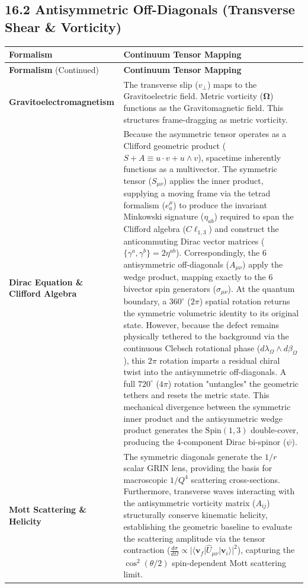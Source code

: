 \vspace{0.2 cm}

\subsection*{ 16.2 Antisymmetric Off-Diagonals (Transverse Shear \& Vorticity)}
\renewcommand{\arraystretch}{1.5}
\begin{longtable}{p{} p{}}
    \hline
    \textbf{Formalism} & \textbf{Continuum Tensor Mapping} \\
    \hline
    \endfirsthead
    \hline
    \textbf{Formalism} (Continued) & \textbf{Continuum Tensor Mapping} \\
    \hline
    \endhead
    \hline
    \endfoot
    \textbf{Gravitoelectromagnetism} & The transverse slip ($v_{\perp}$) maps to the Gravitoelectric field. Metric vorticity ($\boldsymbol{\Omega}$) functions as the Gravitomagnetic field. This structures frame-dragging as metric vorticity. \\ 
    \textbf{Dirac Equation \& Clifford Algebra} & Because the asymmetric tensor operates as a Clifford geometric product ($S + A \equiv u \cdot v + u \wedge v$), spacetime inherently functions as a multivector.  The symmetric tensor ($S_{\mu\nu}$) applies the inner product, supplying a moving frame via the tetrad formalism ($e^\mu_a$) to produce the invariant Minkowski signature ($\eta_{ab}$) required to span the Clifford algebra ($C\ell_{1,3}$) and construct the anticommuting Dirac vector matrices ($\{ \gamma^a, \gamma^b \} = 2\eta^{ab}$). Correspondingly, the 6 antisymmetric off-diagonals ($A_{\mu\nu}$) apply the wedge product, mapping exactly to the 6 bivector spin generators ($\sigma_{\mu\nu}$). At the quantum boundary, a $360^\circ$ ($2\pi$) spatial rotation returns the symmetric volumetric identity to its original state. However, because the defect remains physically tethered to the background via the continuous Clebsch rotational phase ($d\lambda_\Omega \wedge d\beta_\Omega$), this $2\pi$ rotation imparts a residual chiral twist into the antisymmetric off-diagonals. A full $720^\circ$ ($4\pi$) rotation "untangles" the geometric tethers and resets the metric state.  This mechanical divergence between the symmetric inner product and the antisymmetric wedge product generates the $\text{Spin}(1,3)$ double-cover, producing the 4-component Dirac bi-spinor ($\psi$). \\
    \textbf{Mott Scattering \& Helicity} & The symmetric diagonals generate the $1/r$ scalar GRIN lens, providing the basis for macroscopic $1/Q^4$ scattering cross-sections. Furthermore, transverse waves interacting with the antisymmetric vorticity matrix ($A_{ij}$) structurally conserve kinematic helicity, establishing the geometric baseline to evaluate the scattering amplitude via the tensor contraction ($\frac{d\sigma}{d\Omega} \propto |\langle \mathbf{v}_f | \hat{U}_{\mu\nu} | \mathbf{v}_i \rangle|^2$), capturing the $\cos^2(\theta/2)$ spin-dependent Mott scattering limit. \\ 

\end{longtable}
